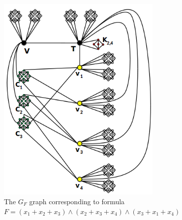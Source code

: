 \begin{figure}[htb]	
\center%
\includegraphics[width=8cm]{./img/exemploGrafoGFSBPO4.png}
\caption{The $G_{F}$ graph corresponding to formula $F=(x_1+ x_2+ x_3) \wedge  (x_2+ x_3+ x_4 )\wedge  (x_3 + x_1 + x_4 )$}
\label{fig:exemploGrafoGF}
\end{figure}